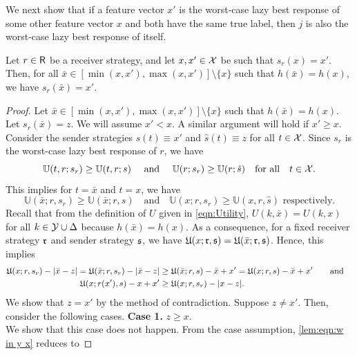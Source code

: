 We next show that if a feature vector $x'$ is the worst-case lazy best response of some other feature vector $x$ and both have the same true label, then $j$ is also the worst-case lazy best response of itself.

\begin{lem}\label{lem:self bestresponse}
    Let $r \in \mathsf{R}$ be a receiver strategy, and let $x,x' \in \mathcal{X}$ be such that $s_r(x) = x'$. Then, for all $\bar{x} \in [\min(x,x'),\max(x,x')] \setminus \{x\}$ such that $h(\bar{x}) = h(x)$, we have $s_r(\bar{x}) = x'$.
\end{lem}

\begin{proof}\label{proof:self bestresponse}
     Let $\bar{x} \in [\min(x,x'),\max(x,x')] \setminus \{x\}$ such that $h(\bar{x}) = h(x)$. Let $s_r(\bar{x}) = z$. We will assume $x' < x$. A similar argument will hold if $x' \geq x$. Consider the sender strategies $s(t) \equiv x'$ and $\hat{s}(t) \equiv z$ for all $t \in \mathcal{X}$. Since $s_r$ is the worst-case lazy best response of $r$, we have
   $$\mathbb{U}(t,r;s_r) \geq \mathbb{U}(t,r;s) \text{ and } \mathbb{U}(r;s_r) \geq \mathbb{U}(r;\hat{s}) \text{for all} t \in \cg{X}.$$
    This implies for $t= \bar{x}$ and $t=x$, we have
    $$
    \mathbb{U}(\bar{x};r,s_r) \geq \mathbb{U}(\bar{x};r,s) \quad \text{and} \quad \mathbb{U}(x;r,s_r) \geq \mathbb{U}(x,r,\hat{s}) \text{ respectively}.
    $$
    Recall that from the definition of $U$ given in \eqref{eqn:Utility}, $U(k,\bar{x}) = U(k,x)$ for all $k \in \mathcal{Y} \cup \Delta$ because $h(\bar{x}) = h(x)$. As a consequence, for a fixed receiver strategy $\mathfrak{r}$ and sender strategy $\mathfrak{s}$, we have $\mathfrak{U}(x;\mathfrak{r},\mathfrak{s}) = \mathfrak{U}(\bar{x};\mathfrak{r},\mathfrak{s})$. Hence, this implies
    \begin{equation}\label{lem:eqn:w in y x}
    \begin{aligned}
        \mathfrak{U}(x;r,s_r) - |\bar{x}-z| = \mathfrak{U}(\bar{x};r,s_r) - |\bar{x}-z| &\geq \mathfrak{U}(\bar{x};r,s) - \bar{x} + x' = \mathfrak{U}(x;r,s) - \bar{x} + x' \quad \hbox{\quad and\quad} \\
        \mathfrak{U}(x;r(x'),s) - x + x' &\geq \mathfrak{U}(x;r,s_r) - |x-z|.
    \end{aligned}
    \end{equation}
    We show that $z = x'$ by the method of contradiction. Suppose $z \neq x'$. Then, consider the following cases.
\textbf{Case 1. }{$z \geq x$.} \\
        We show that this case does not happen. From the case assumption, \eqref{lem:eqn:w in y x} reduces to

\end{proof}
